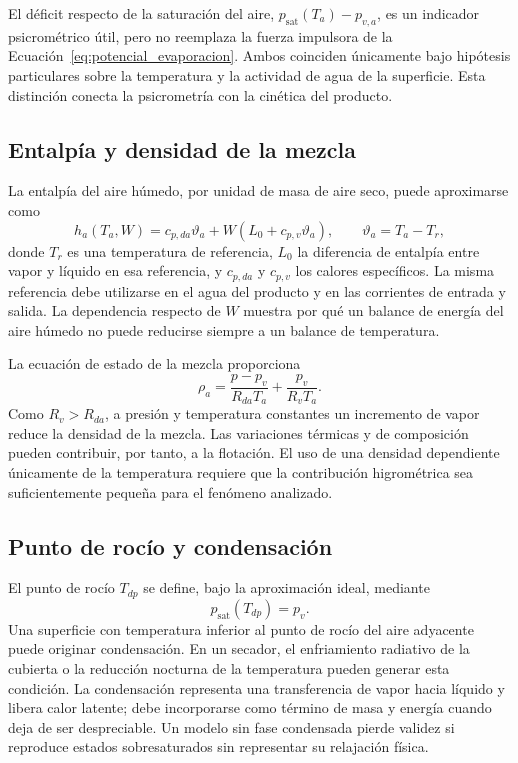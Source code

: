 El déficit respecto de la saturación del aire,
$p_{\mathrm{sat}}(T_a)-p_{v,a}$, es un indicador psicrométrico útil, pero no reemplaza la fuerza impulsora de la Ecuación~\eqref{eq:potencial_evaporacion}. Ambos coinciden únicamente bajo hipótesis particulares sobre la temperatura y la actividad de agua de la superficie. Esta distinción conecta la psicrometría con la cinética del producto.

\subsection{Entalpía y densidad de la mezcla}

La entalpía del aire húmedo, por unidad de masa de aire seco, puede aproximarse como
\begin{equation}
h_a(T_a,W)=c_{p,da}\vartheta_a
+W\left(L_0+c_{p,v}\vartheta_a\right),
\qquad
\vartheta_a=T_a-T_r,
\label{eq:entalpia_aire_humedo}
\end{equation}
donde $T_r$ es una temperatura de referencia, $L_0$ la diferencia de entalpía entre vapor y líquido en esa referencia, y $c_{p,da}$ y $c_{p,v}$ los calores específicos. La misma referencia debe utilizarse en el agua del producto y en las corrientes de entrada y salida. La dependencia respecto de $W$ muestra por qué un balance de energía del aire húmedo no puede reducirse siempre a un balance de temperatura.

La ecuación de estado de la mezcla proporciona
\begin{equation}
\rho_a=\frac{p-p_v}{R_{da}T_a}+\frac{p_v}{R_vT_a}.
\label{eq:densidad_aire_humedo}
\end{equation}
Como $R_v>R_{da}$, a presión y temperatura constantes un incremento de vapor reduce la densidad de la mezcla. Las variaciones térmicas y de composición pueden contribuir, por tanto, a la flotación. El uso de una densidad dependiente únicamente de la temperatura requiere que la contribución higrométrica sea suficientemente pequeña para el fenómeno analizado.

\subsection{Punto de rocío y condensación}

El punto de rocío $T_{dp}$ se define, bajo la aproximación ideal, mediante
\begin{equation}
p_{\mathrm{sat}}(T_{dp})=p_v.
\label{eq:punto_rocio}
\end{equation}
Una superficie con temperatura inferior al punto de rocío del aire adyacente puede originar condensación. En un secador, el enfriamiento radiativo de la cubierta o la reducción nocturna de la temperatura pueden generar esta condición. La condensación representa una transferencia de vapor hacia líquido y libera calor latente; debe incorporarse como término de masa y energía cuando deja de ser despreciable. Un modelo sin fase condensada pierde validez si reproduce estados sobresaturados sin representar su relajación física.


